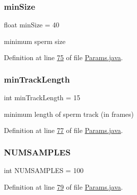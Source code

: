 \subsubsection{\texorpdfstring{min\+Size}{minSize}}
{\footnotesize\ttfamily float min\+Size = 40\hspace{0.3cm}{\ttfamily [static]}}

minimum sperm size 

Definition at line \hyperlink{_params_8java_source_l00075}{75} of file \hyperlink{_params_8java_source}{Params.\+java}.

\hypertarget{classdata_1_1_params_aa730fe10ba7a04b3871e8ff2ea8cc834}{}\label{classdata_1_1_params_aa730fe10ba7a04b3871e8ff2ea8cc834} 
\subsubsection{\texorpdfstring{min\+Track\+Length}{minTrackLength}}
{\footnotesize\ttfamily int min\+Track\+Length = 15\hspace{0.3cm}{\ttfamily [static]}}

minimum length of sperm track (in frames) 

Definition at line \hyperlink{_params_8java_source_l00077}{77} of file \hyperlink{_params_8java_source}{Params.\+java}.

\hypertarget{classdata_1_1_params_ae808f1c980157cfd070c6e09e587e2aa}{}\label{classdata_1_1_params_ae808f1c980157cfd070c6e09e587e2aa} 
\subsubsection{\texorpdfstring{N\+U\+M\+S\+A\+M\+P\+L\+ES}{NUMSAMPLES}}
{\footnotesize\ttfamily int N\+U\+M\+S\+A\+M\+P\+L\+ES = 100\hspace{0.3cm}{\ttfamily [static]}}



Definition at line \hyperlink{_params_8java_source_l00079}{79} of file \hyperlink{_params_8java_source}{Params.\+java}.

\hypertarget{classdata_1_1_params_a193425ff40a106f84f7980effb603136}{}\label{classdata_1_1_params_a193425ff40a106f84f7980effb603136} 
